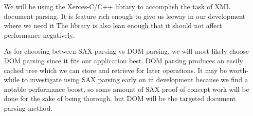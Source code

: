 We will be using the Xerces-C/C++ library to accomplish the task of XML document parsing.
It is feature rich enough to give us leeway in our development where we need it
The library is also lean enough that it should not affect performance negatively.

As for choosing between SAX parsing vs DOM parsing, we will most likely choose DOM parsing since it fits our application best.
DOM parsing produces an easily cached tree which we can store and retrieve for later operations.
It may be worth-while to investigate using SAX parsing early on in development because we find a notable performance boost, so some amount of SAX proof of concept work will be done for the sake of being thorough, but DOM will be the targeted document parsing method.
